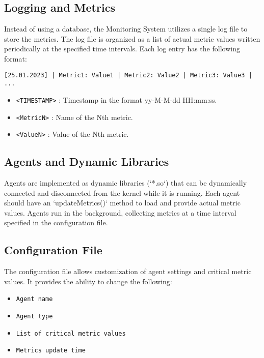 \documentclass[12pt, a4paper]{article}
\begin{document}
\subsection{Logging and Metrics}
Instead of using a database, the Monitoring System utilizes a single log file to store the metrics. The log file is organized as a list of actual metric values written periodically at the specified time intervals. Each log entry has the following format:

\noindent\texttt{[25.01.2023] | Metric1: Value1 | Metric2: Value2 | Metric3: Value3 | ...}

\begin{itemize}
    \item \texttt{<TIMESTAMP>} : Timestamp in the format yy-M-M-dd HH:mm:ss.
    \item \texttt{<MetricN>} : Name of the Nth metric.
    \item \texttt{<ValueN>} : Value of the Nth metric.
\end{itemize}

\subsection{Agents and Dynamic Libraries}
Agents are implemented as dynamic libraries (`*.so`) that can be dynamically connected and disconnected from the kernel while it is running. Each agent should have an `updateMetrics()` method to load and provide actual metric values. Agents run in the background, collecting metrics at a time interval specified in the configuration file.

\subsection{Configuration File}
The configuration file allows customization of agent settings and critical metric values. It provides the ability to change the following:
\begin{itemize}
    \item \texttt{Agent name}
    \item \texttt{Agent type}
    \item \texttt{List of critical metric values}
    \item \texttt{Metrics update time}
\end{itemize}
\end{document}
